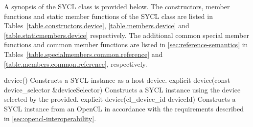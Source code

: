 A synopsis of the SYCL  class is provided below. The constructors, member functions and static member functions of the SYCL  class are listed in Tables~\ref{table.constructors.device}, \ref{table.members.device} and \ref{table.staticmembers.device} respectively. The additional common special member functions and common member functions are listed in \ref{sec:reference-semantics} in Tables~\ref{table.specialmembers.common.reference} and \ref{table.members.common.reference}, respectively.



  \addRow
    {device()}
    {
      Constructs a SYCL  instance as a host device.
    }
  \addRow
    {explicit device(const device_selector \&deviceSelector)}
    {
      Constructs a SYCL  instance using the device selected by the  provided.
    }
  \addRow
    {explicit device(cl_device_id deviceId)}
    {    
     Constructs a SYCL  instance from an OpenCL  in accordance with the requirements described in \ref{sec:opencl-interoperability}.
    }
\completeTable

